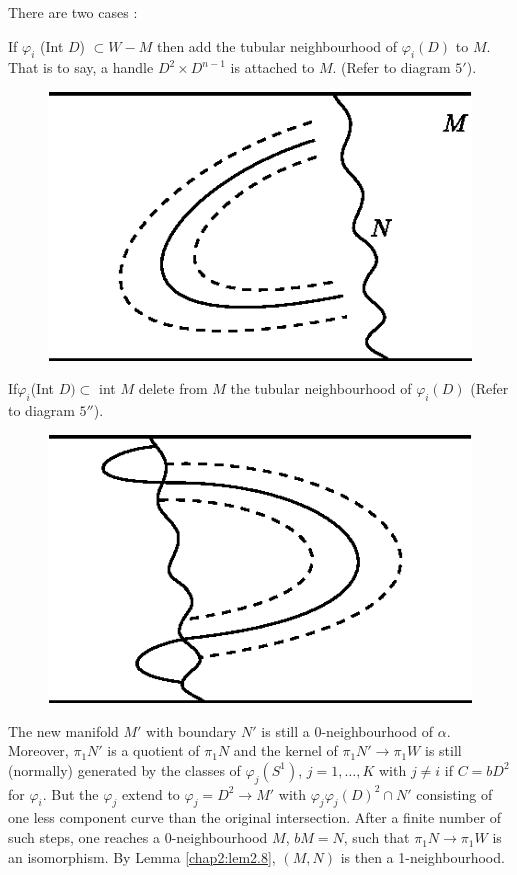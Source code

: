 There are two cases :

If $\varphi_i$ (Int $D$) $\subset W - M$ then add the tubular
neighbourhood of $\varphi_i (D)$ to $M$. That is to say, a handle $D^2
\times D^{n-1}$ is attached to $M$. (Refer to diagram $5'$). 
 
\begin{figure}[H]
\centering
\includegraphics{vol46-fig/fig46-4.eps}
\end{figure}


If\pageoriginale $\varphi_i$(Int $D)\subset$ int $M$ delete from $M$
the tubular neighbourhood of $\varphi_i (D)$ (Refer to diagram $5''$).  

\begin{figure}[H]
\centering
\includegraphics{vol46-fig/fig46-5.eps}
\end{figure}


The new manifold $M'$ with boundary $N'$ is still a 0-neighbourhood of
$\alpha$. Moreover, $\pi_1 N'$ is a quotient of $\pi_1 N$ and the
kernel of $\pi_1 N'  \to \pi_1 W$ is still (normally) generated by the
classes of $\varphi_j(S^1)$, $j = 1, \ldots, K$ with $j \neq i$ if $C =
bD^2$ for $\varphi_i$. But the $\varphi_j$ extend to $\varphi_j = D^2 \to M'$ with
$\varphi_j \varphi_j (D)^2 \cap N'$ consisting of one  less component curve
than the original intersection. After a finite number of such steps,
one reaches a 0-neighbourhood $M$, $bM = N$, such that $\pi_1 N\to
\pi_1 W$ is an isomorphism. By Lemma \ref{chap2:lem2.8}, $(M, N)$ is then a 
1-neighbourhood.  

